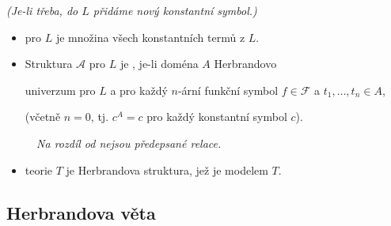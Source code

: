     {\it (Je-li třeba, do $L$ přidáme nový konstantní symbol.)}
    \smallskip
    \begin{itemize}
    \item {} pro $L$ je množina všech konstantních termů z $L$.
    \smallskip
    
    
    \vspace{-6mm}
    \item Struktura $\mathcal{A}$ pro $L$ je , je-li doména $A$ Herbrandovo
    \smallskip
    
    univerzum pro $L$ a pro každý $n$-ární funkční symbol $f\in \mathcal{F}$ a $t_1,\dots,t_n\in A$,
    
    \vspace{-2mm}
    
    \vspace{-4mm}
    (včetně $n=0$, tj. $c^A=c$ pro každý konstantní symbol $c$).
    \smallskip
    
    {\it {}\ \ Na rozdíl od  nejsou předepsané relace.}
    \smallskip
    
    \smallskip
    
    \item {} teorie $T$ je Herbrandova struktura, jež je modelem $T$.
    
    
    \end{itemize}
    
    

\subsection{Herbrandova věta}\todo

